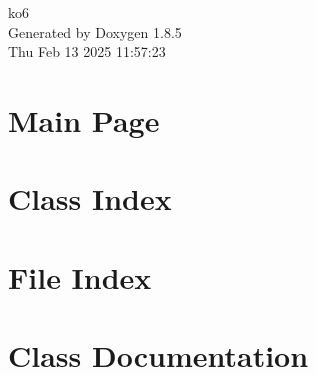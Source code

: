 \documentclass[twoside]{book}
\newcommand{\clearemptydoublepage}{%
  \newpage{\pagestyle{empty}\cleardoublepage}%
}
\begin{document}
\hypersetup{pageanchor=false}
\begin{titlepage}
\vspace*{7cm}
\begin{center}%
{\Large ko6 }\\
\vspace*{1cm}
{\large Generated by Doxygen 1.8.5}\\
\vspace*{0.5cm}
{\small Thu Feb 13 2025 11:57:23}\\
\end{center}
\end{titlepage}
\clearemptydoublepage
\tableofcontents
\clearemptydoublepage
{}
\hypersetup{pageanchor=true}

\chapter{Main Page}
\label{index}\hypertarget{index}{}
\chapter{Class Index}

\chapter{File Index}

\chapter{Class Documentation}








































\end{document}
